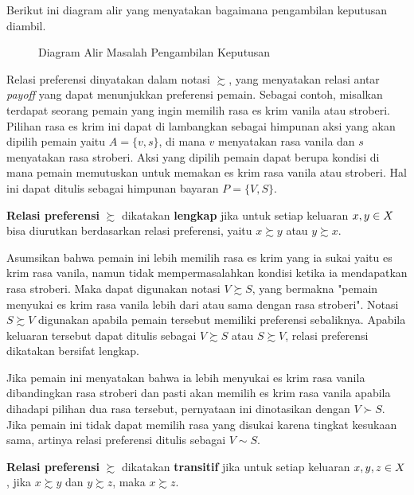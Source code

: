 Berikut ini diagram alir yang menyatakan bagaimana pengambilan keputusan diambil.

\begin{figure}[H]
    \centering
    
    \caption{Diagram Alir Masalah Pengambilan Keputusan}
\end{figure}

Relasi preferensi dinyatakan dalam notasi $\succsim$, yang menyatakan relasi antar \textit{payoff} yang dapat menunjukkan preferensi pemain. Sebagai contoh, misalkan terdapat seorang pemain yang ingin memilih rasa es krim vanila atau stroberi. Pilihan rasa es krim ini dapat di lambangkan sebagai himpunan aksi yang akan dipilih pemain yaitu  $A = \lbrace v, s\rbrace$, di mana $v$ menyatakan rasa vanila dan $s$ menyatakan rasa stroberi. Aksi yang dipilih pemain dapat berupa kondisi di mana pemain memutuskan untuk memakan es krim rasa vanila atau stroberi. Hal ini dapat ditulis sebagai himpunan bayaran $P = \lbrace V, S\rbrace$.

\begin{aksioma}
    \textbf{Relasi preferensi} $\succsim$ dikatakan \textbf{lengkap} jika untuk setiap keluaran $x,\space y \in X$ bisa diurutkan berdasarkan relasi preferensi, yaitu $x \succsim y$ atau $y \succsim x$.
\end{aksioma}

Asumsikan bahwa pemain ini lebih memilih rasa es krim yang ia sukai yaitu es krim rasa vanila, namun tidak mempermasalahkan kondisi ketika ia mendapatkan rasa stroberi. Maka dapat digunakan notasi $V \succsim S$, yang bermakna "pemain menyukai es krim rasa vanila lebih dari atau sama dengan rasa stroberi". Notasi $S \succsim V$ digunakan apabila pemain tersebut memiliki preferensi sebaliknya.
Apabila keluaran tersebut dapat ditulis sebagai $V \succsim S$ atau $S \succsim V$, relasi preferensi dikatakan bersifat lengkap.

Jika pemain ini menyatakan bahwa ia lebih menyukai es krim rasa vanila dibandingkan rasa stroberi dan pasti akan memilih es krim rasa vanila apabila dihadapi pilihan dua rasa tersebut, pernyataan ini dinotasikan dengan $V \succ S$. Jika pemain ini tidak dapat memilih rasa yang disukai karena tingkat kesukaan sama, artinya relasi preferensi ditulis sebagai $V \sim S$.

\begin{aksioma}
    \textbf{Relasi preferensi} $\succsim$ dikatakan \textbf{transitif} jika untuk setiap keluaran $x,\space y, \space z \in X$, jika $x \succsim y$ dan $y \succsim z$, maka $x \succsim z$.
\end{aksioma}


